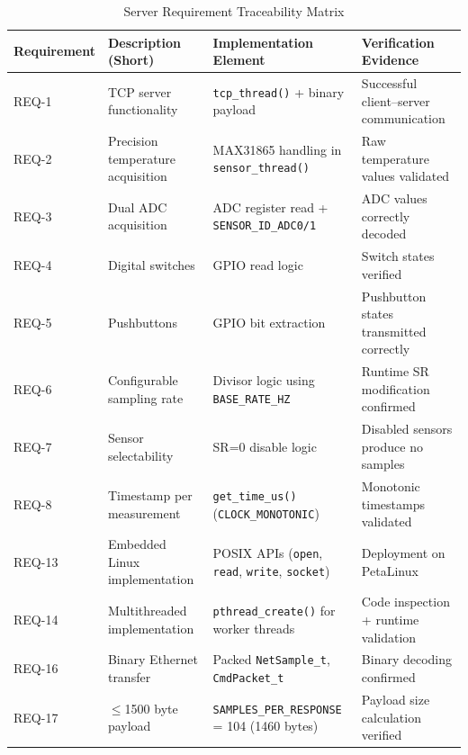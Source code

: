 \clearpage
\begin{landscape}
	\thispagestyle{plain}
	
	\begin{table}[p]
		\centering
		\caption{Server Requirement Traceability Matrix}
		\label{tab:server_rtm}
		\renewcommand{\arraystretch}{1.2}
		\setlength{\tabcolsep}{6pt}
		
		\begin{tabularx}{\linewidth}{|l|X|X|X|}
			\hline
			\textbf{Requirement} & \textbf{Description (Short)} & \textbf{Implementation Element} & \textbf{Verification Evidence} \\
			\hline
			
			REQ-1  & TCP server functionality & \texttt{tcp\_thread()} + binary payload & Successful client--server communication \\
			\hline
			REQ-2  & Precision temperature acquisition & MAX31865 handling in \texttt{sensor\_thread()} & Raw temperature values validated \\
			\hline
			REQ-3  & Dual ADC acquisition & ADC register read + \texttt{SENSOR\_ID\_ADC0/1} & ADC values correctly decoded \\
			\hline
			REQ-4  & Digital switches & GPIO read logic & Switch states verified \\
			\hline
			REQ-5  & Pushbuttons & GPIO bit extraction & Pushbutton states transmitted correctly \\
			\hline
			REQ-6  & Configurable sampling rate & Divisor logic using \texttt{BASE\_RATE\_HZ} & Runtime SR modification confirmed \\
			\hline
			REQ-7  & Sensor selectability & SR=0 disable logic & Disabled sensors produce no samples \\
			\hline
			REQ-8  & Timestamp per measurement & \texttt{get\_time\_us()} (\texttt{CLOCK\_MONOTONIC}) & Monotonic timestamps validated \\
			\hline
			REQ-13 & Embedded Linux implementation & POSIX APIs (\texttt{open}, \texttt{read}, \texttt{write}, \texttt{socket}) & Deployment on PetaLinux \\
			\hline
			REQ-14 & Multithreaded implementation & \texttt{pthread\_create()} for worker threads & Code inspection + runtime validation \\
			\hline
			REQ-16 & Binary Ethernet transfer & Packed \texttt{NetSample\_t}, \texttt{CmdPacket\_t} & Binary decoding confirmed \\
			\hline
			REQ-17 & $\leq$1500 byte payload & \texttt{SAMPLES\_PER\_RESPONSE} = 104 (1460 bytes) & Payload size calculation verified \\

\end{tabularx}
\end{table}
\end{landscape}
